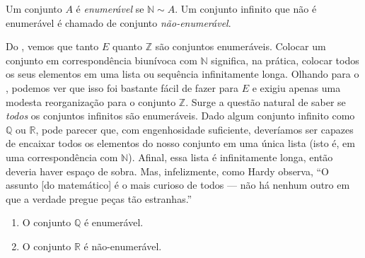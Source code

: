  
\begin{definition}\label{def:conjunto-enumeravel}
Um conjunto $A$ é \textit{enumerável} se $\mathbb{N} \sim A$. Um conjunto infinito que não é enumerável é chamado de conjunto \textit{não-enumerável}.
\end{definition}

Do , vemos que tanto $E$ quanto $\mathbb{Z}$ são conjuntos enumeráveis. Colocar um conjunto em correspondência biunívoca com $\mathbb{N}$ significa, na prática, colocar todos os seus elementos em uma lista ou sequência infinitamente longa. Olhando para o , podemos ver que isso foi bastante fácil de fazer para $E$ e exigiu apenas uma modesta reorganização para o conjunto $\mathbb{Z}$. Surge a questão natural de saber se \textit{todos} os conjuntos infinitos são enumeráveis. Dado algum conjunto infinito como $\mathbb{Q}$ ou $\mathbb{R}$, pode parecer que, com engenhosidade suficiente, deveríamos ser capazes de encaixar todos os elementos do nosso conjunto em uma única lista (isto é, em uma correspondência com $\mathbb{N}$). Afinal, essa lista é infinitamente longa, então deveria haver espaço de sobra. Mas, infelizmente, como Hardy observa, ``O assunto [do matemático] é o mais curioso de todos --- não há nenhum outro em que a verdade pregue peças tão estranhas.''

   
\begin{theorem}\label{thm:Q-enumeravel-R-nao-enumeravel}
\begin{enumerate}[label=(\roman*)]
\item O conjunto $\mathbb{Q}$ é enumerável.
\item O conjunto $\mathbb{R}$ é não-enumerável.
\end{enumerate}
\end{theorem}

